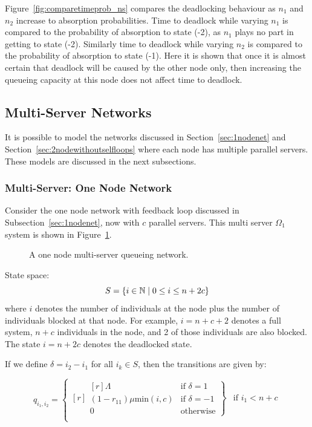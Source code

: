\documentclass{article}
\begin{document}
Figure~\ref{fig:comparetimeprob_ns} compares the deadlocking behaviour as $n_1$ and $n_2$ increase to absorption probabilities.
Time to deadlock while varying $n_1$ is compared to the probability of absorption to state (-2), as $n_1$ plays no part in getting to state (-2).
Similarly time to deadlock while varying $n_2$ is compared to the probability of absorption to state (-1).
Here it is shown that once it is almost certain that deadlock will be caused by the other node only, then increasing the queueing capacity at this node does not affect time to deadlock.


\subsection{Multi-Server Networks}
It is possible to model the networks discussed in Section~\ref{sec:1nodenet} and Section~\ref{sec:2nodewithoutselfloops} where each node has multiple parallel servers.
These models are discussed in the next subsections.

\subsubsection{Multi-Server: One Node Network}\label{sec:onenodemulti}
Consider the one node network with feedback loop discussed in Subsection~\ref{sec:1nodenet}, now with $c$ parallel servers.
This multi server $\Omega_1$ system is shown in Figure~\ref{fig:queueingnetwork_1nodemulti}.

\begin{figure}[!htbp]
  
  \caption{A one node multi-server queueing network.}
  \label{fig:queueingnetwork_1nodemulti}
\end{figure}

State space:
        \[S = \{i\in\mathbb{N} \nonscript\; | \nonscript\; 0 \leq i \leq n + 2c\}\]
where \(i\) denotes the number of individuals at the node plus the number of individuals blocked at that node.
For example, $i=n+c+2$ denotes a full system, $n+c$ individuals in the node, and 2 of those individuals are also blocked.
The state $i=n+2c$ denotes the deadlocked state.

If we define $\delta = i_2 - i_1$ for all $i_k \in S$, then the transitions are given by:

\begin{equation}
  q_{i_1, i_2} = \left\{
  \begin{matrix*}[ r ]
    \left. \begin{matrix*}[ r ]
      \Lambda & \text{if } \delta = 1 \\
      (1-r_{11})\mu\text{min}(i, c) & \text{if } \delta = -1 \\
      0 & \text{otherwise}
    \end{matrix*} \right\} & \text{if } i_1 < n + c \\
  \end{matrix*} \right.
\end{equation}
\end{document}
